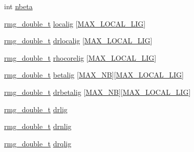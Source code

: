 \begin{DoxyCompactItemize}
\item 
int \hyperlink{struct_s_p_e_c_i_e_s_a8555e5f8912b8e782d23e15476338a33}{nbeta}
\item 
\hyperlink{rmgtypes_8h_aaa16921c14f121c56eaa42390a340db8}{rmg\-\_\-double\-\_\-t} \hyperlink{struct_s_p_e_c_i_e_s_a3b821368ef41007cf8673744d2c827af}{localig} \mbox{[}\hyperlink{_t_d_d_f_t_2_headers_2params_8h_aa0d2d7cede5d9d8023a3dcb8861a3511}{M\-A\-X\-\_\-\-L\-O\-C\-A\-L\-\_\-\-L\-I\-G}\mbox{]}
\item 
\hyperlink{rmgtypes_8h_aaa16921c14f121c56eaa42390a340db8}{rmg\-\_\-double\-\_\-t} \hyperlink{struct_s_p_e_c_i_e_s_a5357221bffef2eb155b85356b2109575}{drlocalig} \mbox{[}\hyperlink{_t_d_d_f_t_2_headers_2params_8h_aa0d2d7cede5d9d8023a3dcb8861a3511}{M\-A\-X\-\_\-\-L\-O\-C\-A\-L\-\_\-\-L\-I\-G}\mbox{]}
\item 
\hyperlink{rmgtypes_8h_aaa16921c14f121c56eaa42390a340db8}{rmg\-\_\-double\-\_\-t} \hyperlink{struct_s_p_e_c_i_e_s_a1285aacdede3997d5817069d5809f807}{rhocorelig} \mbox{[}\hyperlink{_t_d_d_f_t_2_headers_2params_8h_aa0d2d7cede5d9d8023a3dcb8861a3511}{M\-A\-X\-\_\-\-L\-O\-C\-A\-L\-\_\-\-L\-I\-G}\mbox{]}
\item 
\hyperlink{rmgtypes_8h_aaa16921c14f121c56eaa42390a340db8}{rmg\-\_\-double\-\_\-t} \hyperlink{struct_s_p_e_c_i_e_s_a0ceac016f025898c4f83151f3292447d}{betalig} \mbox{[}\hyperlink{_t_d_d_f_t_2_headers_2params_8h_a69689ceba19b751a6a04a29e764b8132}{M\-A\-X\-\_\-\-N\-B}\mbox{]}\mbox{[}\hyperlink{_t_d_d_f_t_2_headers_2params_8h_aa0d2d7cede5d9d8023a3dcb8861a3511}{M\-A\-X\-\_\-\-L\-O\-C\-A\-L\-\_\-\-L\-I\-G}\mbox{]}
\item 
\hyperlink{rmgtypes_8h_aaa16921c14f121c56eaa42390a340db8}{rmg\-\_\-double\-\_\-t} \hyperlink{struct_s_p_e_c_i_e_s_a12daf913281dc6948f9fc5411848e644}{drbetalig} \mbox{[}\hyperlink{_t_d_d_f_t_2_headers_2params_8h_a69689ceba19b751a6a04a29e764b8132}{M\-A\-X\-\_\-\-N\-B}\mbox{]}\mbox{[}\hyperlink{_t_d_d_f_t_2_headers_2params_8h_aa0d2d7cede5d9d8023a3dcb8861a3511}{M\-A\-X\-\_\-\-L\-O\-C\-A\-L\-\_\-\-L\-I\-G}\mbox{]}
\item 
\hyperlink{rmgtypes_8h_aaa16921c14f121c56eaa42390a340db8}{rmg\-\_\-double\-\_\-t} \hyperlink{struct_s_p_e_c_i_e_s_a3cadc56294e0863222190766179c92cd}{drlig}
\item 
\hyperlink{rmgtypes_8h_aaa16921c14f121c56eaa42390a340db8}{rmg\-\_\-double\-\_\-t} \hyperlink{struct_s_p_e_c_i_e_s_a82876389db9d62cdc50aecc49deca653}{drnlig}
\item 
\hyperlink{rmgtypes_8h_aaa16921c14f121c56eaa42390a340db8}{rmg\-\_\-double\-\_\-t} \hyperlink{struct_s_p_e_c_i_e_s_a2ddc90565da2c7a5cc36375d8b763a19}{drqlig}

\end{DoxyCompactItemize}
